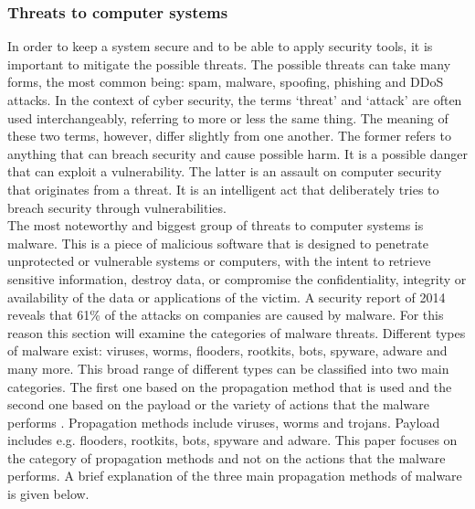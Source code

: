 \subsubsection{Threats to computer systems}


In order to keep a system secure and to be able to apply security tools, it is important to mitigate the possible threats. The possible threats can take many forms, the most common being: spam, malware, spoofing, phishing and  DDoS attacks.  In the context of cyber security, the terms `threat'  and `attack' are often used interchangeably, referring to more or less the same thing. The meaning of these two terms, however, differ slightly from one another. The former refers to anything that can breach security and cause possible harm. It is a possible danger that can exploit a vulnerability. The latter is an assault on computer security that originates from a threat. It is an intelligent act that deliberately tries to breach security through vulnerabilities.  \\

The most noteworthy and biggest group of threats to computer systems is malware. 
This is a piece of malicious software that is designed to penetrate unprotected or vulnerable systems or computers, with the intent to retrieve sensitive information, destroy data, or compromise the confidentiality, integrity or availability of the data or applications of the victim. A security report of 2014 \cite{SurveyKaspersky} reveals that 61\% of the attacks on companies are caused by malware. For this reason this section will examine the categories of malware threats. Different types of malware exist: viruses, worms, flooders, rootkits, bots, spyware, adware and many more. This broad range of different types can be classified into two main categories. The first one based on the propagation method that is used and the second one based on the payload or the variety of actions that the malware performs \cite{stallings2007network}. Propagation methods include viruses, worms and trojans. Payload includes e.g. flooders, rootkits, bots, spyware and adware. This paper focuses on the category of propagation methods and not on the actions that the malware performs. A brief explanation of the three main propagation methods of malware is given below.  


